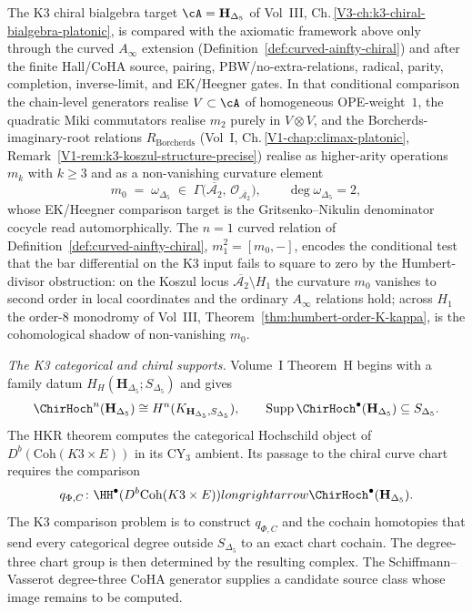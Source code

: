 \begin{remark}
\label{rem:axioms-k3-bkm-curved-ainfty}%
%
%
%
The K3 chiral bialgebra target $\cA = \mathbf{H}_{\Delta_5}$ of
Vol~III, Ch.\,\ref{V3-ch:k3-chiral-bialgebra-platonic}, is compared
with the axiomatic framework above only through the curved
$A_\infty$ extension (Definition~\ref{def:curved-ainfty-chiral}) and
after the finite Hall/CoHA source, pairing, PBW/no-extra-relations,
radical, parity, completion, inverse-limit, and EK/Heegner gates. In
that conditional comparison the chain-level generators realise
$V\subset\cA$ of homogeneous
OPE-weight~$1$, the quadratic Miki commutators realise $m_2$
purely in $V\otimes V$, and the Borcherds-imaginary-root relations
$R_{\mathrm{Borcherds}}$
\textup{(}Vol~I, Ch.\,\ref{V1-chap:climax-platonic},
Remark~\textup{\ref{V1-rem:k3-koszul-structure-precise}}\textup{)}
realise as higher-arity operations $m_k$ with $k\geq 3$ and as
a non-vanishing curvature element
\[
 m_0 \;=\; \omega_{\Delta_5} \;\in\; \Gamma\!\bigl(
 \overline{\mathcal{A}_2},\, \mathcal{O}_{\overline{\mathcal{A}_2}}\bigr),
 \qquad
 \deg \omega_{\Delta_5} = 2,
\]
whose EK/Heegner comparison target is the Gritsenko--Nikulin
denominator cocycle read automorphically. The $n=1$ curved relation of
Definition~\ref{def:curved-ainfty-chiral}, $m_1^2 = [m_0, -]$,
encodes the conditional test that the bar differential on the K3 input
fails to square to zero by the Humbert-divisor obstruction: on
the Koszul locus $\overline{\mathcal{A}_2}\setminus H_1$ the
curvature $m_0$ vanishes to second order in local coordinates and
the ordinary $A_\infty$ relations hold; across $H_1$ the order-$8$
monodromy of Vol~III,
Theorem~\textup{\ref{thm:humbert-order-K-kappa}}, is the
cohomological shadow of non-vanishing $m_0$.

\smallskip
\noindent\emph{The K3 categorical and chiral supports.}
Volume~I Theorem~H begins with a family datum
$H_H(\mathbf H_{\Delta_5};S_{\Delta_5})$ and gives
\[
 \ChirHoch^n(\mathbf H_{\Delta_5})
 \cong H^n(K_{\mathbf H_{\Delta_5},S_{\Delta_5}}),
 \qquad
 \operatorname{Supp}\ChirHoch^\bullet(\mathbf H_{\Delta_5})
 \subseteq S_{\Delta_5}.
\]
The HKR theorem computes the categorical Hochschild object of
$D^b(\mathrm{Coh}(K3\times E))$ in its CY$_3$ ambient.  Its passage
to the chiral curve chart requires the comparison
\[
 q_{\Phi,C}\colon
 \HH^\bullet(D^b\mathrm{Coh}(K3\times E))longrightarrow
 \ChirHoch^\bullet(\mathbf H_{\Delta_5}).
\]
The K3 comparison problem is to construct $q_{\Phi,C}$ and the
cochain homotopies that send every categorical degree outside
$S_{\Delta_5}$ to an exact chart cochain.  The degree-three chart
group is then determined by the resulting complex.  The
Schiffmann--Vasserot degree-three CoHA generator supplies a candidate
source class whose image remains to be computed.


\end{remark}
